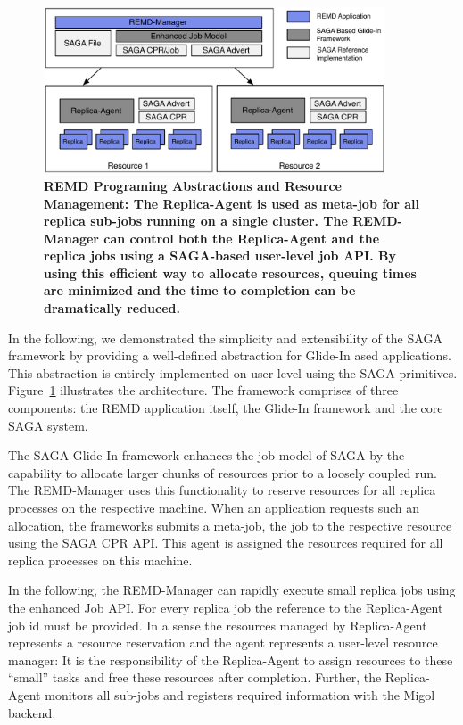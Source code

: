 \documentclass{rspublic}
\newcommand{\glidein}[1]{Glide-In }
\newcommand{\replicaagent}[1]{Replica-Agent }
\begin{document}
\begin{figure}[th]
    \centering
    \includegraphics[width=0.9\textwidth]{remdmanager_v11}
    \caption{\footnotesize \bf REMD Programing Abstractions and
      Resource Management: The Replica-Agent is used as meta-job
      for all replica sub-jobs running on a single cluster. The
      REMD-Manager can control both the \replicaagent\ and the
      replica jobs using a SAGA-based user-level job API. By using this efficient
      way to allocate resources, queuing times are minimized and the
      time to completion can be dramatically reduced.}
    \label{fig:remdmanager_v1.1}
\end{figure}

In the following, we demonstrated the simplicity and extensibility of the SAGA framework by providing a
well-defined abstraction for \glidein based applications. This abstraction is entirely implemented
on user-level using the SAGA primitives.
Figure~\ref{fig:remdmanager_v1.1} illustrates the architecture. 
The framework comprises of three components: the REMD application itself,
the \glidein\ framework and the core SAGA system.
        
The SAGA \glidein\ framework enhances the job model of SAGA by the capability to allocate
larger chunks of resources prior to a loosely coupled run. The REMD-Manager uses
this functionality to reserve resources for all replica processes on the respective machine.
When an application requests such an allocation, the frameworks submits a meta-job,
the \textit{\replicaagent} job to the respective resource  using
the SAGA CPR API. This agent is assigned the resources required for
all replica processes on this machine. 

In the following, the REMD-Manager can rapidly execute small replica jobs using the 
enhanced Job API. For every replica job the reference
to the \replicaagent\  job id must be provided. In a sense the resources 
managed by \replicaagent\ represents a resource reservation 
and the agent represents a user-level resource manager: It is the 
responsibility of the \replicaagent\  to assign resources to
these ``small'' tasks and free these resources after completion. Further, 
the \replicaagent\ monitors all sub-jobs and registers required information with the Migol backend.
\end{document}
